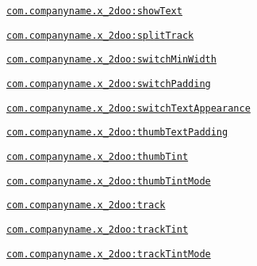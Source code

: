 {\tt \hyperlink{classandroid_1_1support_1_1v4_1_1_r_1_1styleable_0cc5a1a2d3ed39ddffe812e716bf2ef4}{com.companyname.x\_\-2doo:showText}}

{\tt \hyperlink{classandroid_1_1support_1_1v4_1_1_r_1_1styleable_a0d331497170a5613b2fe77a4e795649}{com.companyname.x\_\-2doo:splitTrack}}

{\tt \hyperlink{classandroid_1_1support_1_1v4_1_1_r_1_1styleable_98a2bf49a68fe279d68595eef6c847a2}{com.companyname.x\_\-2doo:switchMinWidth}}

{\tt \hyperlink{classandroid_1_1support_1_1v4_1_1_r_1_1styleable_86212afa1c1fecc95d7678773e2d9e52}{com.companyname.x\_\-2doo:switchPadding}}

{\tt \hyperlink{classandroid_1_1support_1_1v4_1_1_r_1_1styleable_60389d42c7e89427896a6b7567ba54a5}{com.companyname.x\_\-2doo:switchTextAppearance}}

{\tt \hyperlink{classandroid_1_1support_1_1v4_1_1_r_1_1styleable_8ad125e9cbf83b9f8f070fdeab78cbbe}{com.companyname.x\_\-2doo:thumbTextPadding}}

{\tt \hyperlink{classandroid_1_1support_1_1v4_1_1_r_1_1styleable_136537e09affe833ba67adc81baf4df6}{com.companyname.x\_\-2doo:thumbTint}}

{\tt \hyperlink{classandroid_1_1support_1_1v4_1_1_r_1_1styleable_6e084fdf50ded0b3372355ed70bb4849}{com.companyname.x\_\-2doo:thumbTintMode}}

{\tt \hyperlink{classandroid_1_1support_1_1v4_1_1_r_1_1styleable_e711e9fa38386ec6f701a57cc3ac8c6e}{com.companyname.x\_\-2doo:track}}

{\tt \hyperlink{classandroid_1_1support_1_1v4_1_1_r_1_1styleable_d119b35aaef8f728924d474d789a2286}{com.companyname.x\_\-2doo:trackTint}}

{\tt \hyperlink{classandroid_1_1support_1_1v4_1_1_r_1_1styleable_dd018911d038be332e08eef22a606e52}{com.companyname.x\_\-2doo:trackTintMode}}

